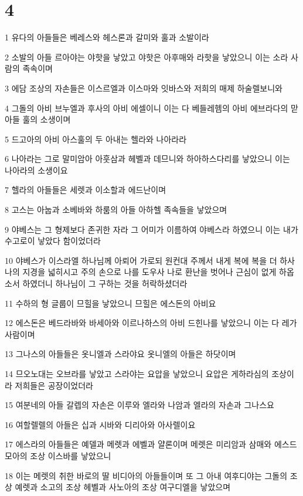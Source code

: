 \chapter{4}

\par 1 유다의 아들들은 베레스와 헤스론과 갈미와 훌과 소발이라
\par 2 소발의 아들 르아야는 야핫을 낳았고 야핫은 아후매와 라핫을 낳았으니 이는 소라 사람의 족속이며
\par 3 에담 조상의 자손들은 이스르엘과 이스마와 잇바스와 저희의 매제 하술렐보니와
\par 4 그돌의 아비 브누엘과 후사의 아비 에셀이니 이는 다 베들레헴의 아비 에브라다의 맏아들 훌의 소생이며
\par 5 드고아의 아비 아스훌의 두 아내는 헬라와 나아라라
\par 6 나아라는 그로 말미암아 아훗삼과 헤벨과 데므니와 하아하스다리를 낳았으니 이는 나아라의 소생이요
\par 7 헬라의 아들들은 세렛과 이소할과 에드난이며
\par 8 고스는 아눕과 소베바와 하룸의 아들 아하헬 족속들을 낳았으며
\par 9 야베스는 그 형제보다 존귀한 자라 그 어미가 이름하여 야베스라 하였으니 이는 내가 수고로이 낳았다 함이었더라
\par 10 야베스가 이스라엘 하나님께 아뢰어 가로되 원컨대 주께서 내게 복에 복을 더 하사 나의 지경을 넓히시고 주의 손으로 나를 도우사 나로 환난을 벗어나 근심이 없게 하옵소서 하였더니 하나님이 그 구하는 것을 허락하셨더라
\par 11 수하의 형 글룹이 므힐을 낳았으니 므힐은 에스돈의 아비요
\par 12 에스돈은 베드라바와 바세아와 이르나하스의 아비 드힌나를 낳았으니 이는 다 레가 사람이며
\par 13 그나스의 아들들은 옷니엘과 스라야요 옷니엘의 아들은 하닷이며
\par 14 므오노대는 오브라를 낳았고 스라야는 요압을 낳았으니 요압은 게하라심의 조상이라 저희들은 공장이었더라
\par 15 여분네의 아들 갈렙의 자손은 이루와 엘라와 나암과 엘라의 자손과 그나스요
\par 16 여할렐렐의 아들은 십과 시바와 디리아와 아사렐이요
\par 17 에스라의 아들들은 예델과 메렛과 에벨과 얄론이며 메렛은 미리암과 삼매와 에스드모아의 조상 이스바를 낳았으니
\par 18 이는 메렛의 취한 바로의 딸 비디아의 아들들이며 또 그 아내 여후디야는 그돌의 조상 예렛과 소고의 조상 헤벨과 사노아의 조상 여구디엘을 낳았으며
